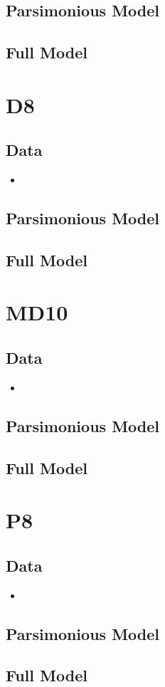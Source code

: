 \documentclass[12pt]{amsart}
\begin{document}
\subsection{Parsimonious Model}

\subsection{Full Model}

\section{D8}
\subsection{Data}
\begin{itemize}
\item
\end{itemize}
\subsection{Parsimonious Model}

\subsection{Full Model}

\section{MD10}
\subsection{Data}
\begin{itemize}
\item
\end{itemize}
\subsection{Parsimonious Model}

\subsection{Full Model}

\section{P8}
\subsection{Data}
\begin{itemize}
\item
\end{itemize}
\subsection{Parsimonious Model}

\subsection{Full Model}
\end{document}
